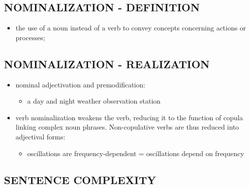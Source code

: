 \subsection{NOMINALIZATION - DEFINITION}

\begin{itemize}
\item the use of a noun instead of a verb to convey concepts concerning actions or processes;
\end{itemize}

\subsection{NOMINALIZATION - REALIZATION}

\begin{itemize}

\item nominal adjectivation and premodification: 

\begin{itemize}
\item a day and night weather observation station
\end{itemize}

\item verb nominalization weakens the verb, reducing it to the function of copula linking complex noun phrases. Non-copulative verbs are thus reduced into adjectival forms:

\begin{itemize}
\item oscillations are frequency-dependent = oscillations depend on frequency 
\end{itemize} 

\end{itemize}

\subsection{SENTENCE COMPLEXITY}

